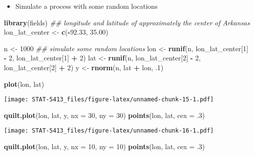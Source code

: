 \documentclass[]{book}
\newenvironment{Shaded}{\begin{snugshade}}{\end{snugshade}}
\newcommand{\CommentTok}[1]{\textcolor[rgb]{0.56,0.35,0.01}{\textit{#1}}}
\newcommand{\DataTypeTok}[1]{\textcolor[rgb]{0.13,0.29,0.53}{#1}}
\newcommand{\DecValTok}[1]{\textcolor[rgb]{0.00,0.00,0.81}{#1}}
\newcommand{\FloatTok}[1]{\textcolor[rgb]{0.00,0.00,0.81}{#1}}
\newcommand{\KeywordTok}[1]{\textcolor[rgb]{0.13,0.29,0.53}{\textbf{#1}}}
\newcommand{\NormalTok}[1]{#1}
\newcommand{\OperatorTok}[1]{\textcolor[rgb]{0.81,0.36,0.00}{\textbf{#1}}}
\newcommand{\StringTok}[1]{\textcolor[rgb]{0.31,0.60,0.02}{#1}}
\providecommand{\tightlist}{%
  \setlength{\itemsep}{0pt}\setlength{\parskip}{0pt}}
\begin{document}
\begin{itemize}
\tightlist
\item
  Simulate a process with some random locations
\end{itemize}

\begin{Shaded}
\begin{Highlighting}[]
\KeywordTok{library}\NormalTok{(fields)}
\CommentTok{## longitude and latitude of approximately the center of Arkansas}
\NormalTok{lon_lat_center <-}\StringTok{ }\KeywordTok{c}\NormalTok{(}\OperatorTok{-}\FloatTok{92.33}\NormalTok{, }\FloatTok{35.00}\NormalTok{) }

\NormalTok{n   <-}\StringTok{ }\DecValTok{1000}
\CommentTok{## simulate some random locations}
\NormalTok{lon  <-}\StringTok{ }\KeywordTok{runif}\NormalTok{(n, lon_lat_center[}\DecValTok{1}\NormalTok{] }\OperatorTok{-}\StringTok{ }\DecValTok{2}\NormalTok{, lon_lat_center[}\DecValTok{1}\NormalTok{] }\OperatorTok{+}\StringTok{ }\DecValTok{2}\NormalTok{)}
\NormalTok{lat  <-}\StringTok{ }\KeywordTok{runif}\NormalTok{(n, lon_lat_center[}\DecValTok{2}\NormalTok{] }\OperatorTok{-}\StringTok{ }\DecValTok{2}\NormalTok{, lon_lat_center[}\DecValTok{2}\NormalTok{] }\OperatorTok{+}\StringTok{ }\DecValTok{2}\NormalTok{)}
\NormalTok{y   <-}\StringTok{ }\KeywordTok{rnorm}\NormalTok{(n, lat }\OperatorTok{+}\StringTok{ }\NormalTok{lon, }\FloatTok{.1}\NormalTok{)}

\KeywordTok{plot}\NormalTok{(lon, lat)}
\end{Highlighting}
\end{Shaded}

\texttt{[image: STAT-5413\_files/figure-latex/unnamed-chunk-15-1.pdf]}

\begin{Shaded}
\begin{Highlighting}[]
\KeywordTok{quilt.plot}\NormalTok{(lon, lat, y, }\DataTypeTok{nx =} \DecValTok{30}\NormalTok{, }\DataTypeTok{ny =} \DecValTok{30}\NormalTok{)}
\KeywordTok{points}\NormalTok{(lon, lat, }\DataTypeTok{cex =} \FloatTok{.3}\NormalTok{)}
\end{Highlighting}
\end{Shaded}

\texttt{[image: STAT-5413\_files/figure-latex/unnamed-chunk-16-1.pdf]}

\begin{Shaded}
\begin{Highlighting}[]
\KeywordTok{quilt.plot}\NormalTok{(lon, lat, y, }\DataTypeTok{nx =} \DecValTok{10}\NormalTok{, }\DataTypeTok{ny =} \DecValTok{10}\NormalTok{)}
\KeywordTok{points}\NormalTok{(lon, lat, }\DataTypeTok{cex =} \FloatTok{.3}\NormalTok{)}
\end{Highlighting}
\end{Shaded}
\end{document}
